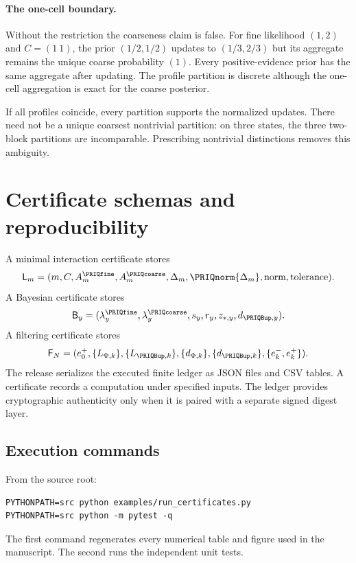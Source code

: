 \documentclass[11pt,oneside,openany]{book}
\numberwithin{equation}{section}
\begin{document}
\paragraph{The one-cell boundary.}
Without the restriction the coarseness claim is false. For fine likelihood $(1,2)$ and $C=(1\ 1)$, the prior $(1/2,1/2)$ updates to $(1/3,2/3)$ but its aggregate remains the unique coarse probability $(1)$. Every positive-evidence prior has the same aggregate after updating. The profile partition is discrete although the one-cell aggregation is exact for the coarse posterior.

If all profiles coincide, every partition supports the normalized updates. There need not be a unique coarsest nontrivial partition: on three states, the three two-block partitions are incomparable. Prescribing nontrivial distinctions removes this ambiguity.

\section{Certificate schemas and reproducibility}\label{PRIQ:app:schemas}
A minimal interaction certificate stores
\begin{equation}\label{PRIQ:eq:lumpability-certificate-schema}
  \mathsf L_m
  =
  (m,C,A_m^{\PRIQfine},A_m^{\PRIQcoarse},\Delta_m,
  \PRIQnorm{\Delta_m},\text{norm},\text{tolerance}).
\end{equation}
A Bayesian certificate stores
\begin{equation}\label{PRIQ:eq:bayes-certificate-schema}
  \mathsf B_y
  =
  (\lambda_y^{\PRIQfine},\lambda_y^{\PRIQcoarse},s_y,r_y,
  z_{*,y},d_{\PRIQBup,y}).
\end{equation}
A filtering certificate stores
\begin{equation}\label{PRIQ:eq:filter-certificate-schema}
  \mathsf F_N
  =
  (e_0^+,\{L_{\Phi,k}\},\{L_{\PRIQBup,k}\},
  \{d_{\Phi,k}\},\{d_{\PRIQBup,k}\},
  \{e_k^-,e_k^+\}).
\end{equation}
The release serializes the executed finite ledger as JSON files and CSV tables.  A certificate records a computation under specified inputs.  The ledger provides cryptographic authenticity only when it is paired with a separate signed digest layer.

\subsection{Execution commands}
From the source root:
\begin{lstlisting}[style=code]
PYTHONPATH=src python examples/run_certificates.py
PYTHONPATH=src python -m pytest -q
\end{lstlisting}
The first command regenerates every numerical table and figure used in the manuscript.  The second runs the independent unit tests.
\end{document}
